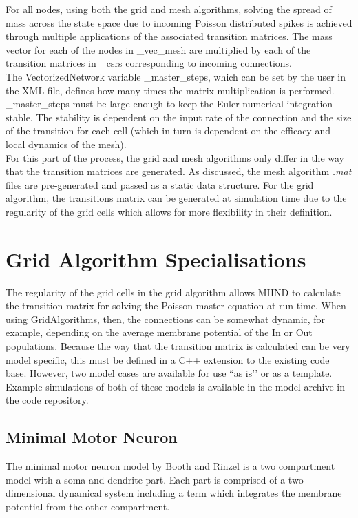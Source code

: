 \documentclass[utf8]{frontiers_suppmat} %
\begin{document}
For all nodes, using both the grid and mesh algorithms, solving the spread of mass across the state space due to incoming Poisson distributed spikes is achieved through multiple applications of the associated transition matrices. The mass vector for each of the nodes in \_vec\_mesh are multiplied by each of the transition matrices in \_csrs corresponding to incoming connections.\\
The VectorizedNetwork variable \_master\_steps, which can be set by the user in the XML file, defines how many times the matrix multiplication is performed. \_master\_steps must be large enough to keep the Euler numerical integration stable. The stability is dependent on the input rate of the connection and the size of the transition for each cell (which in turn is dependent on the efficacy and local dynamics of the mesh). \\
For this part of the process, the grid and mesh algorithms only differ in the way that the transition matrices are generated. As discussed, the mesh algorithm \textit{.mat} files are pre-generated and passed as a static data structure. For the grid algorithm, the transitions matrix can be generated at simulation time due to the regularity of the grid cells which allows for more flexibility in their definition.\\

\section{Grid Algorithm Specialisations}
\label{gridalgospec}
The regularity of the grid cells in the grid algorithm allows MIIND to calculate the transition matrix for solving the Poisson master equation at run time. When using GridAlgorithms, then, the connections can be somewhat dynamic, for example, depending on the average membrane potential of the In or Out populations. Because the way that the transition matrix is calculated can be very model specific, this must be defined in a C++ extension to the existing code base. However, two model cases are available for use ``as is’’ or as a template. Example simulations of both of these models is available in the model archive in the code repository.\\

\subsection{Minimal Motor Neuron}
The minimal motor neuron model by Booth and Rinzel \cite{booth1995minimal} is a two compartment model with a soma and dendrite part. Each part is comprised of a two dimensional dynamical system including a term which integrates the membrane potential from the other compartment. \\
\end{document}
